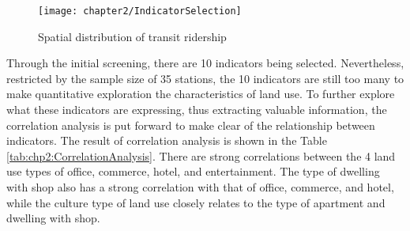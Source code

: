 %
\begin{figure}[htbp]
	\centering
	\texttt{[image: chapter2/IndicatorSelection]}
	\caption{Spatial distribution of transit ridership}
	\label{fig:chp2:IndicatorSelection}
\end{figure}

%
Through the initial screening, there are 10 indicators being selected. Nevertheless, restricted by the sample size of 35 stations, the 10 indicators are still too many to make quantitative exploration the characteristics of land use. To further explore what these indicators are expressing, thus extracting valuable information, the correlation analysis is put forward to make clear of the relationship between indicators. The result of correlation analysis is shown in the Table \ref{tab:chp2:CorrelationAnalysis}. There are strong correlations between the 4 land use types of office, commerce, hotel, and entertainment. The type of dwelling with shop also has a strong correlation with that of office, commerce, and hotel, while the culture type of land use closely relates to the type of apartment and dwelling with shop.


